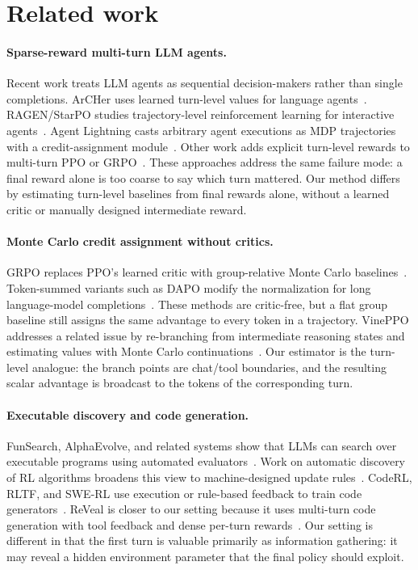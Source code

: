\documentclass[11pt,a4paper]{article}
\begin{document}
\section{Related work}

\paragraph{Sparse-reward multi-turn LLM agents.}
Recent work treats LLM agents as sequential decision-makers rather than single completions. ArCHer uses learned turn-level values for language agents~\cite{zhou2024archer}. RAGEN/StarPO studies trajectory-level reinforcement learning for interactive agents~\cite{wang2025ragen}. Agent Lightning casts arbitrary agent executions as MDP trajectories with a credit-assignment module~\cite{luo2025agentlightning}. Other work adds explicit turn-level rewards to multi-turn PPO or GRPO~\cite{zeng2025turnlevel}. These approaches address the same failure mode: a final reward alone is too coarse to say which turn mattered. Our method differs by estimating turn-level baselines from final rewards alone, without a learned critic or manually designed intermediate reward.

\paragraph{Monte Carlo credit assignment without critics.}
GRPO replaces PPO's learned critic with group-relative Monte Carlo baselines~\cite{shao2024deepseekmath}. Token-summed variants such as DAPO modify the normalization for long language-model completions~\cite{yu2025dapo}. These methods are critic-free, but a flat group baseline still assigns the same advantage to every token in a trajectory. VinePPO addresses a related issue by re-branching from intermediate reasoning states and estimating values with Monte Carlo continuations~\cite{kazemnejad2024vineppo}. Our estimator is the turn-level analogue: the branch points are chat/tool boundaries, and the resulting scalar advantage is broadcast to the tokens of the corresponding turn.

\paragraph{Executable discovery and code generation.}
FunSearch, AlphaEvolve, and related systems show that LLMs can search over executable programs using automated evaluators~\cite{romera-paredes2024funsearch,novikov2025alphaevolve}. Work on automatic discovery of RL algorithms broadens this view to machine-designed update rules~\cite{oh2025discorl}. CodeRL, RLTF, and SWE-RL use execution or rule-based feedback to train code generators~\cite{le2022coderl,liu2023rltf,wei2025swerl}. ReVeal is closer to our setting because it uses multi-turn code generation with tool feedback and dense per-turn rewards~\cite{jin2025reveal}. Our setting is different in that the first turn is valuable primarily as information gathering: it may reveal a hidden environment parameter that the final policy should exploit.
\end{document}
